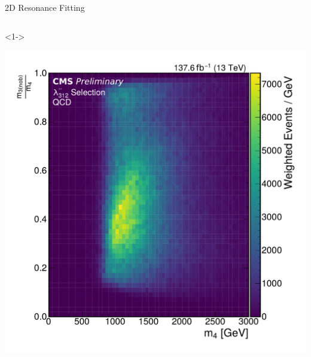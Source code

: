 \documentclass[]{beamer}
\begin{document}
\begin{frame}{2D Resonance Fitting}
\begin{columns}[t]
\begin{column}{0.3\textwidth}
      \begin{onlyenv}<1->
        \begin{center}
          \includegraphics[width=\thiswidth\textwidth]{figures/ratio_m14_vs_m3_top_3_no_lead_b_Skim_QCDInclusive2018.pdf}\\

\end{center}
\end{onlyenv}
\end{column}
\end{columns}
\end{frame}
\end{document}
